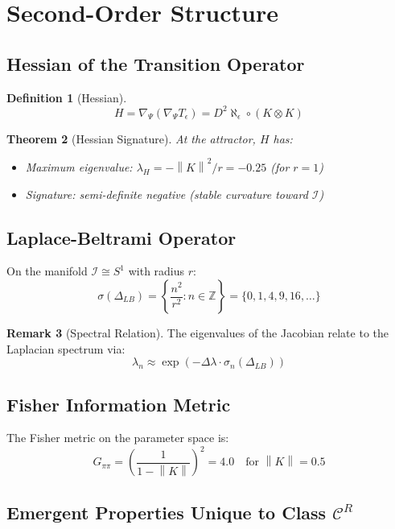 \documentclass[11pt,a4paper]{article}
\theoremstyle{plain}
\newtheorem{theorem}{Theorem}[section]
\theoremstyle{definition}
\newtheorem{definition}[theorem]{Definition}
\newtheorem{remark}[theorem]{Remark}
\newcommand{\I}{\mathcal{I}}
\newcommand{\norm}[1]{\left\lVert #1 \right\rVert}
\begin{document}
\section{Second-Order Structure}

\subsection{Hessian of the Transition Operator}

\begin{definition}[Hessian]
\[
H = \nabla_\Psi(\nabla_\Psi T_\epsilon) = D^2\aleph_\epsilon \circ (K \otimes K)
\]
\end{definition}

\begin{theorem}[Hessian Signature]
At the attractor, $H$ has:
\begin{itemize}
    \item Maximum eigenvalue: $\lambda_H = -\norm{K}^2/r = -0.25$ (for $r = 1$)
    \item Signature: semi-definite negative (stable curvature toward $\I$)
\end{itemize}
\end{theorem}

\subsection{Laplace-Beltrami Operator}

On the manifold $\I \cong S^1$ with radius $r$:
\[
\sigma(\Delta_{LB}) = \left\{ \frac{n^2}{r^2} : n \in \mathbb{Z} \right\} = \{0, 1, 4, 9, 16, \ldots\}
\]

\begin{remark}[Spectral Relation]
The eigenvalues of the Jacobian relate to the Laplacian spectrum via:
\[
\lambda_n \approx \exp\left(-\Delta\lambda \cdot \sigma_n(\Delta_{LB})\right)
\]
\end{remark}

\subsection{Fisher Information Metric}

The Fisher metric on the parameter space is:
\[
G_{\pi\pi} = \left(\frac{1}{1 - \norm{K}}\right)^2 = 4.0 \quad \text{for } \norm{K} = 0.5
\]

\subsection{Emergent Properties Unique to Class $\mathscr{C}^R$}
\end{document}
